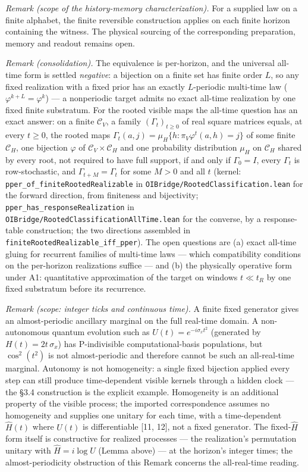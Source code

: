\documentclass[
]{article}
\begin{document}
\emph{Remark (scope of the history-memory characterization).} For a
supplied law on a finite alphabet, the finite reversible construction
applies on each finite horizon containing the witness. The physical
sourcing of the corresponding preparation, memory and readout remains
open.

\emph{Remark (consolidation).} The equivalence is per-horizon, and the
universal all-time form is settled \emph{negative}: a bijection on a
finite set has finite order \(L\), so any fixed realization with a fixed
prior has an exactly \(L\)-periodic multi-time law
(\(\varphi^{k+L} = \varphi^k\)) --- a nonperiodic target admits no exact
all-time realization by one fixed finite substratum. For the rooted
visible maps the all-time question has an exact answer: on a finite
\(\mathcal{C}_V\), a family \((\Gamma_t)_{t \geq 0}\) of real square
matrices equals, at every \(t \geq 0\), the rooted maps
\(\Gamma_t(a, j) = \mu_H\{h : \pi_V \varphi^t(a, h) = j\}\) of some
finite \(\mathcal{C}_H\), one bijection \(\varphi\) of
\(\mathcal{C}_V \times \mathcal{C}_H\) and one probability distribution
\(\mu_H\) on \(\mathcal{C}_H\) shared by every root, not required to
have full support, if and only if \(\Gamma_0 = I\), every \(\Gamma_t\)
is row-stochastic, and \(\Gamma_{t+M} = \Gamma_t\) for some \(M > 0\)
and all \(t\) (kernel: \texttt{pper\_of\_finiteRootedRealizable} in
\texttt{OIBridge/RootedClassification.lean} for the forward direction,
from finiteness and bijectivity; \texttt{pper\_has\_responseRealization}
in \texttt{OIBridge/RootedClassificationAllTime.lean} for the converse,
by a response-table construction; the two directions assembled in
\texttt{finiteRootedRealizable\_iff\_pper}). The open questions are (a)
exact all-time gluing for recurrent families of multi-time laws ---
which compatibility conditions on the per-horizon realizations suffice
--- and (b) the physically operative form under A1: quantitative
approximation of the target on windows \(t \ll t_R\) by one fixed
substratum before its recurrence.

\emph{Remark (scope: integer ticks and continuous time).} A finite fixed
generator gives an almost-periodic ancillary marginal on the full
real-time domain. A non-autonomous quantum evolution such as
\(U(t) = e^{-i \sigma_x t^2}\) (generated by \(H(t) = 2t\,\sigma_x\))
has P-indivisible computational-basis populations, but \(\cos^2(t^2)\)
is not almost-periodic and therefore cannot be such an all-real-time
marginal. Autonomy is not homogeneity: a single fixed bijection applied
every step can still produce time-dependent visible kernels through a
hidden clock --- the §3.4 construction is the explicit example.
Homogeneity is an additional property of the visible process; the
imported correspondence assumes no homogeneity and supplies one unitary
for each time, with a time-dependent \(\hat{H}(t)\) where \(U(t)\) is
differentiable {[}11, 12{]}, not a fixed generator. The
fixed-\(\hat{H}\) form itself is constructive for realized processes ---
the realization's permutation unitary with \(\hat{H} = i \log U\) (Lemma
above) --- at the horizon's integer times; the almost-periodicity
obstruction of this Remark concerns the all-real-time reading.
\end{document}
